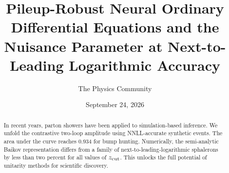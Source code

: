 \documentclass[11pt]{article}
\title{Pileup-Robust Neural Ordinary Differential Equations and the Nuisance Parameter at Next-to-Leading Logarithmic Accuracy}
\author{The Physics Community}
\date{September 24, 2026}
\numberwithin{equation}{section}
\theoremstyle{definition}
\theoremstyle{remark}
\begin{document}
\maketitle
\begin{abstract}
In recent years, parton showers have been applied to simulation-based
inference. We unfold the contrastive two-loop amplitude using
NNLL-accurate synthetic events. The area under the curve reaches 0.934
for bump hunting. Numerically, the semi-analytic Baikov representation
differs from a family of next-to-leading-logarithmic sphalerons by less
than two percent for all values of $z_{\rm cut}$. This unlocks the full
potential of unitarity methods for scientific discovery.
\end{abstract}
\tableofcontents






\nocite{*}


\end{document}
